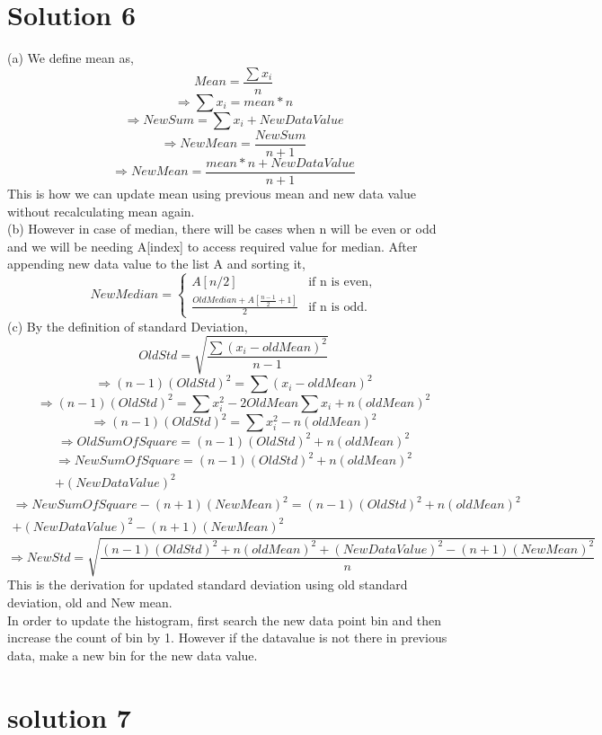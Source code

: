 \documentclass[fleqn]{article}
\begin{document}
\section{Solution 6}
(a) We define mean as,
\[
    Mean=\frac{\sum {x_{i}}}{n}
\]
\[
\Rightarrow \sum {x_{i}} = mean * n
\]
\[
\Rightarrow NewSum =  \sum {x_{i}} + NewDataValue
\]
\[
\Rightarrow NewMean = \frac{NewSum}{n+1}
\]
\[
\Rightarrow NewMean = \frac{mean * n + NewDataValue}{n+1}
\]
This is how we can update mean using previous mean and new data value without recalculating mean again.\\
(b) However in case of median, there will be cases when n will be even or odd and we will be needing A[index] to access required value for median.
After appending new data value to the list A and sorting it,
\[
NewMedian=\begin{cases} 
A[n/2] & \text{if n is even} , \\
\frac{OldMedian+A[\frac{n-1}{2}+1]}{2} & \text{if n is odd}.
\end{cases}
\]
(c) By the definition of standard Deviation,
\[
OldStd=\sqrt{\frac{\sum{(x_{i}-oldMean)^2}}{n-1}}
\]
\[
\Rightarrow(n-1)(OldStd)^2 = \sum{(x_{i}-oldMean)^2}
\]
\[
\Rightarrow(n-1)(OldStd)^2 = \sum{x_{i}^2} - 2OldMean\sum{x_{i}} + n(oldMean)^2
\]
\[
\Rightarrow(n-1)(OldStd)^2 = \sum{x_{i}^2} -n(oldMean)^2
\]
\[
\Rightarrow OldSumOfSquare = (n-1)(OldStd)^2 + n(oldMean)^2
\]
\begin{multline*}
    \Rightarrow NewSumOfSquare = (n-1)(OldStd)^2 + n(oldMean)^2\\ + (NewDataValue)^2
\end{multline*}
\begin{multline*}
    \Rightarrow NewSumOfSquare - (n+1)(NewMean)^2 = (n-1)(OldStd)^2 + n(oldMean)^2\\  + (NewDataValue)^2 - (n+1)(NewMean)^2
\end{multline*}
\[
\Rightarrow NewStd = \sqrt{\frac{(n-1)(OldStd)^2 + n(oldMean)^2 + (NewDataValue)^2 - (n+1)(NewMean)^2}{n}}
\]
This is the derivation for updated standard deviation using old standard deviation, old and New mean.\\
In order to update the histogram, first search the new data point bin and then increase the count of bin by 1. However if the datavalue is not there in previous data, make a new bin for the new data value.

\newpage
\section{solution 7}
\end{document}

